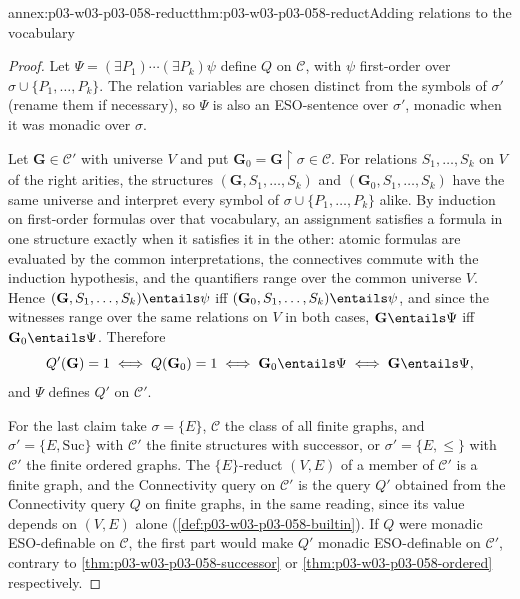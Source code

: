 \begin{annexitem}{annex:p03-w03-p03-058-reduct}{thm:p03-w03-p03-058-reduct}{Adding relations to the vocabulary}
\begin{proof}
Let \(\Psi=(\exists P_1)\cdots(\exists P_k)\psi\) define \(Q\) on
\(\mathcal C\), with \(\psi\) first-order over
\(\sigma\cup\{P_1,\ldots,P_k\}\). The relation variables are chosen distinct
from the symbols of \(\sigma'\) (rename them if necessary), so \(\Psi\) is
also an ESO-sentence over \(\sigma'\), monadic when it was monadic over
\(\sigma\).

Let \(\mathbf G\in\mathcal C'\) with universe \(V\) and put
\(\mathbf G_0=\mathbf G{\restriction}\sigma\in\mathcal C\). For relations
\(S_1,\ldots,S_k\) on \(V\) of the right arities, the structures
\((\mathbf G,S_1,\ldots,S_k)\) and \((\mathbf G_0,S_1,\ldots,S_k)\) have the
same universe and interpret every symbol of
\(\sigma\cup\{P_1,\ldots,P_k\}\) alike. By induction on first-order
formulas over that vocabulary, an assignment satisfies a formula in one
structure exactly when it satisfies it in the other: atomic formulas are
evaluated by the common interpretations, the connectives commute with the
induction hypothesis, and the quantifiers range over the common universe
\(V\). Hence \((\mathbf G,S_1,\ldots,S_k)\entails\psi\) iff
\((\mathbf G_0,S_1,\ldots,S_k)\entails\psi\), and since the witnesses range
over the same relations on \(V\) in both cases,
\(\mathbf G\entails\Psi\) iff \(\mathbf G_0\entails\Psi\). Therefore
\[
 Q'(\mathbf G)=1\iff Q(\mathbf G_0)=1\iff\mathbf G_0\entails\Psi\iff
 \mathbf G\entails\Psi,
\]
and \(\Psi\) defines \(Q'\) on \(\mathcal C'\).

For the last claim take \(\sigma=\{E\}\), \(\mathcal C\) the class of all
finite graphs, and \(\sigma'=\{E,\mathrm{Suc}\}\) with \(\mathcal C'\) the
finite structures with successor, or \(\sigma'=\{E,\le\}\) with
\(\mathcal C'\) the finite ordered graphs. The \(\{E\}\)-reduct
\((V,E)\) of a member of \(\mathcal C'\) is a finite graph, and the
Connectivity query on \(\mathcal C'\) is the query \(Q'\) obtained from the
Connectivity query \(Q\) on finite graphs, in the same reading, since its
value depends on \((V,E)\) alone
(\cref{def:p03-w03-p03-058-builtin}). If \(Q\) were monadic ESO-definable on
\(\mathcal C\), the first part would make \(Q'\) monadic ESO-definable on
\(\mathcal C'\), contrary to \cref{thm:p03-w03-p03-058-successor} or
\cref{thm:p03-w03-p03-058-ordered} respectively.
\end{proof}
\end{annexitem}

